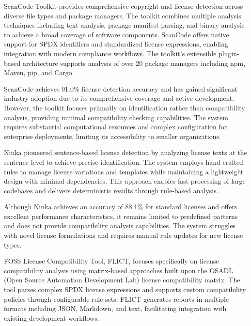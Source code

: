 ScanCode Toolkit \cite{scancode2021} provides comprehensive copyright and license detection across diverse file types and package managers. The toolkit combines multiple analysis techniques including text analysis, package manifest parsing, and binary analysis to achieve a broad coverage of software components. ScanCode offers native support for SPDX identifiers and standardized license expressions, enabling integration with modern compliance workflows. The toolkit's extensible plugin-based architecture supports analysis of over 20 package managers including npm, Maven, pip, and Cargo.

ScanCode achieves 91.0\% license detection accuracy and has gained significant industry adoption due to its comprehensive coverage and active development. However, the toolkit focuses primarily on identification rather than compatibility analysis, providing minimal compatibility checking capabilities. The system requires substantial computational resources and complex configuration for enterprise deployments, limiting its accessibility to smaller organizations.

Ninka \cite{GermanMI10} pioneered sentence-based license detection by analyzing license texts at the sentence level to achieve precise identification. The system employs hand-crafted rules to manage license variations and templates while maintaining a lightweight design with minimal dependencies. This approach enables fast processing of large codebases and delivers deterministic results through rule-based analysis.

Although Ninka achieves an accuracy of 88.1\% for standard licenses and offers excellent performance characteristics, it remains limited to predefined patterns and does not provide compatibility analysis capabilities. The system struggles with novel license formulations and requires manual rule updates for new license types.


FOSS License Compatibility Tool, FLICT, \cite{flict2025} focuses specifically on license compatibility analysis using matrix-based approaches built upon the OSADL (Open Source Automation Development Lab) license compatibility matrix. The tool parses complex SPDX license expressions and supports custom compatibility policies through configurable rule sets. FLICT generates reports in multiple formats including JSON, Markdown, and text, facilitating integration with existing development workflows.

